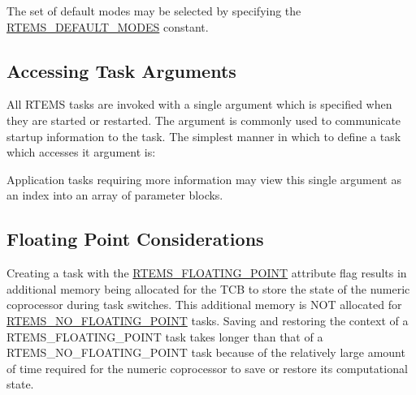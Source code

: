 The set of default modes may be selected by specifying the \mbox{\hyperlink{group__ClassicModes_ga809c838116a3079c58fb6e41d7f1782a}{R\+T\+E\+M\+S\+\_\+\+D\+E\+F\+A\+U\+L\+T\+\_\+\+M\+O\+D\+ES}} constant.\hypertarget{group__ClassicTasks_ClassicTasksSecAccessingTaskArguments}{}\subsection{Accessing Task Arguments}\label{group__ClassicTasks_ClassicTasksSecAccessingTaskArguments}
All R\+T\+E\+MS tasks are invoked with a single argument which is specified when they are started or restarted. The argument is commonly used to communicate startup information to the task. The simplest manner in which to define a task which accesses it argument is\+:


\begin{DoxyCode}{0}
\DoxyCodeLine{);}
\end{DoxyCode}


Application tasks requiring more information may view this single argument as an index into an array of parameter blocks.\hypertarget{group__ClassicTasks_ClassicTasksSecFloatingPointConsiderations}{}\subsection{Floating Point Considerations}\label{group__ClassicTasks_ClassicTasksSecFloatingPointConsiderations}
Creating a task with the \mbox{\hyperlink{group__ClassicAttributes_gac0368fd84c0d3e0f969d72afc5126881}{R\+T\+E\+M\+S\+\_\+\+F\+L\+O\+A\+T\+I\+N\+G\+\_\+\+P\+O\+I\+NT}} attribute flag results in additional memory being allocated for the T\+CB to store the state of the numeric coprocessor during task switches. This additional memory is N\+OT allocated for \mbox{\hyperlink{group__ClassicAttributes_ga514fb0bc840344fb4b221b646a30f5c2}{R\+T\+E\+M\+S\+\_\+\+N\+O\+\_\+\+F\+L\+O\+A\+T\+I\+N\+G\+\_\+\+P\+O\+I\+NT}} tasks. Saving and restoring the context of a {\ttfamily R\+T\+E\+M\+S\+\_\+\+F\+L\+O\+A\+T\+I\+N\+G\+\_\+\+P\+O\+I\+NT} task takes longer than that of a {\ttfamily R\+T\+E\+M\+S\+\_\+\+N\+O\+\_\+\+F\+L\+O\+A\+T\+I\+N\+G\+\_\+\+P\+O\+I\+NT} task because of the relatively large amount of time required for the numeric coprocessor to save or restore its computational state.

